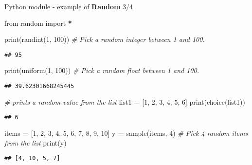 \documentclass[
  8pt,
  ignorenonframetext,
]{beamer}
\newenvironment{Shaded}{\begin{snugshade}}{\end{snugshade}}
\newcommand{\BuiltInTok}[1]{#1}
\newcommand{\CommentTok}[1]{\textcolor[rgb]{0.56,0.35,0.01}{\textit{#1}}}
\newcommand{\DecValTok}[1]{\textcolor[rgb]{0.00,0.00,0.81}{#1}}
\newcommand{\ImportTok}[1]{#1}
\newcommand{\NormalTok}[1]{#1}
\newcommand{\OperatorTok}[1]{\textcolor[rgb]{0.81,0.36,0.00}{\textbf{#1}}}
\begin{document}
\begin{frame}[fragile]{Python module - example of \textbf{Random} 3/4}
\protect\hypertarget{python-module---example-of-random-34}{}
\begin{Shaded}
\begin{Highlighting}[]
\ImportTok{from}\NormalTok{ random }\ImportTok{import} \OperatorTok{*}

\BuiltInTok{print}\NormalTok{(randint(}\DecValTok{1}\NormalTok{, }\DecValTok{100}\NormalTok{))    }\CommentTok{\# Pick a random integer between 1 and 100.}
\end{Highlighting}
\end{Shaded}

\begin{verbatim}
## 95
\end{verbatim}

\begin{Shaded}
\begin{Highlighting}[]
\BuiltInTok{print}\NormalTok{(uniform(}\DecValTok{1}\NormalTok{, }\DecValTok{100}\NormalTok{))    }\CommentTok{\# Pick a random float between 1 and 100.}
\end{Highlighting}
\end{Shaded}

\begin{verbatim}
## 39.62301668245445
\end{verbatim}

\begin{Shaded}
\begin{Highlighting}[]
\CommentTok{\# prints a random value from the list}
\NormalTok{list1 }\OperatorTok{=}\NormalTok{ [}\DecValTok{1}\NormalTok{, }\DecValTok{2}\NormalTok{, }\DecValTok{3}\NormalTok{, }\DecValTok{4}\NormalTok{, }\DecValTok{5}\NormalTok{, }\DecValTok{6}\NormalTok{]}
\BuiltInTok{print}\NormalTok{(choice(list1))}
\end{Highlighting}
\end{Shaded}

\begin{verbatim}
## 6
\end{verbatim}

\begin{Shaded}
\begin{Highlighting}[]
\NormalTok{items }\OperatorTok{=}\NormalTok{ [}\DecValTok{1}\NormalTok{, }\DecValTok{2}\NormalTok{, }\DecValTok{3}\NormalTok{, }\DecValTok{4}\NormalTok{, }\DecValTok{5}\NormalTok{, }\DecValTok{6}\NormalTok{, }\DecValTok{7}\NormalTok{, }\DecValTok{8}\NormalTok{, }\DecValTok{9}\NormalTok{, }\DecValTok{10}\NormalTok{]}
\NormalTok{y }\OperatorTok{=}\NormalTok{ sample(items, }\DecValTok{4}\NormalTok{)    }\CommentTok{\# Pick 4 random items from the list}
\BuiltInTok{print}\NormalTok{(y)}
\end{Highlighting}
\end{Shaded}

\begin{verbatim}
## [4, 10, 5, 7]
\end{verbatim}
\end{frame}
\end{document}
